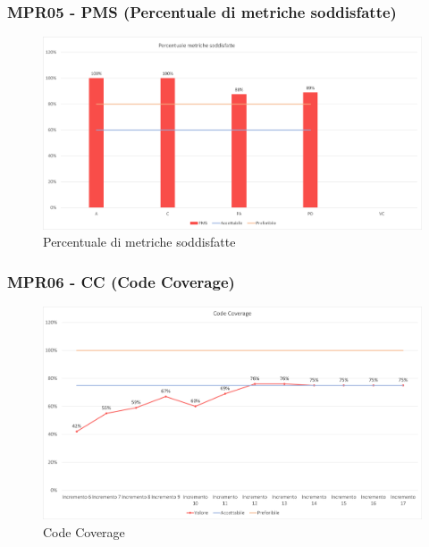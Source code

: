 \subsubsection{MPR05 - PMS (Percentuale di metriche soddisfatte)}
\begin{figure}[!ht]
    \caption{Percentuale di metriche soddisfatte}
    \vspace{10px}
    \includegraphics[scale=0.5]{sezioni/immagini/MetricheSoddisfatte.png}
    \centering
\end{figure}
\newpage
\subsubsection{MPR06 - CC (Code Coverage)}
\begin{figure}[!ht]
    \caption{Code Coverage}
    \vspace{10px}
    \includegraphics[scale=0.5]{sezioni/immagini/CodeCoverage.png}
    \centering
\end{figure}

